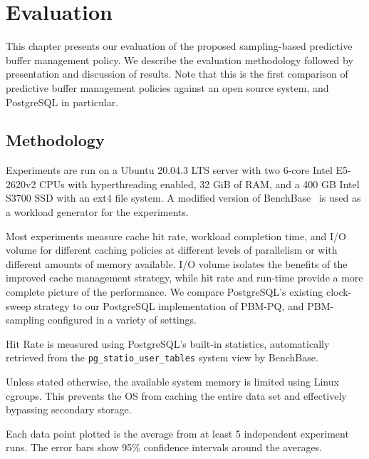 
\chapter{Evaluation}

This chapter presents our evaluation of the proposed sampling-based predictive buffer management policy. We describe the evaluation methodology followed by presentation and discussion of results. Note that this is the first comparison of predictive buffer management policies against an open source system, and PostgreSQL in particular.

\section{Methodology}
Experiments are run on a Ubuntu 20.04.3 LTS server with two 6-core Intel E5-2620v2 CPUs with hyperthreading enabled, 32 GiB of RAM, and a 400 GB Intel S3700 SSD with an ext4 file system. A modified version of BenchBase~\cite{BenchBase} is used as a workload generator for the experiments.


Most experiments measure cache hit rate, workload completion time, and I/O volume for different caching policies at different levels of parallelism or with different amounts of memory available. I/O volume isolates the benefits of the improved cache management strategy, while hit rate and run-time provide a more complete picture of the performance. We compare PostgreSQL's existing clock-sweep strategy to our PostgreSQL implementation of PBM-PQ, and PBM-sampling configured in a variety of settings.

Hit Rate is measured using PostgreSQL's built-in statistics, automatically retrieved from the \verb|pg_statio_user_tables| system view by BenchBase.

Unless stated otherwise, the available system memory is limited using Linux cgroups. This prevents the OS from caching the entire data set and effectively bypassing secondary storage.

Each data point plotted is the average from at least 5 independent experiment runs. The error bars show 95\% confidence intervals around the averages.


